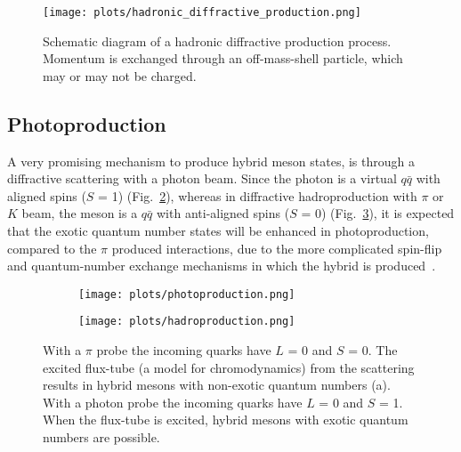 \begin{figure}[H]
    \centering
        \texttt{[image: plots/hadronic\_diffractive\_production.png]}
        \caption{Schematic diagram of a hadronic diffractive production process. Momentum is exchanged through an off-mass-shell particle, which may or may not be charged.}
        \label{fig.1.3.2}
\end{figure}

 \subsection{Photoproduction}

 A very promising mechanism to produce hybrid meson states, is through a diffractive scattering with a photon beam. Since the photon is a virtual $q\bar{q}$ with aligned spins ($S$ = 1) (Fig.~\ref{fig.1.3.3.1.a}), whereas in diffractive hadroproduction with $\pi$ or $K$ beam, the meson is a $q\bar{q}$ with anti-aligned spins ($S$ = 0) (Fig.~\ref{fig.1.3.3.1.b}), it is expected that the exotic quantum number states will be enhanced in photoproduction, compared to the $\pi$ produced interactions, due to the more complicated spin-flip and quantum-number exchange mechanisms in which the hybrid is produced~\cite{13, 14}.

 \begin{figure}[H]
    \centering
    \begin{subfigure}[b]{0.45\textwidth}
        \texttt{[image: plots/photoproduction.png]}
        \caption{}
        \label{fig.1.3.3.1.a}
    \end{subfigure}\hfill
    \begin{subfigure}[b]{0.4\textwidth}
        \texttt{[image: plots/hadroproduction.png]}
        \caption{}
        \label{fig.1.3.3.1.b}
    \end{subfigure}
    \caption{With a $\pi$ probe the incoming quarks have $L$ = 0 and $S$ = 0. The excited flux-tube (a model for chromodynamics) from the scattering results in hybrid mesons with non-exotic quantum numbers (a). With a photon probe the incoming quarks have $L$ = 0 and $S$ = 1. When the flux-tube is excited, hybrid mesons with exotic quantum numbers are possible.}
    \label{fig.1.3.3.1}
\end{figure}

